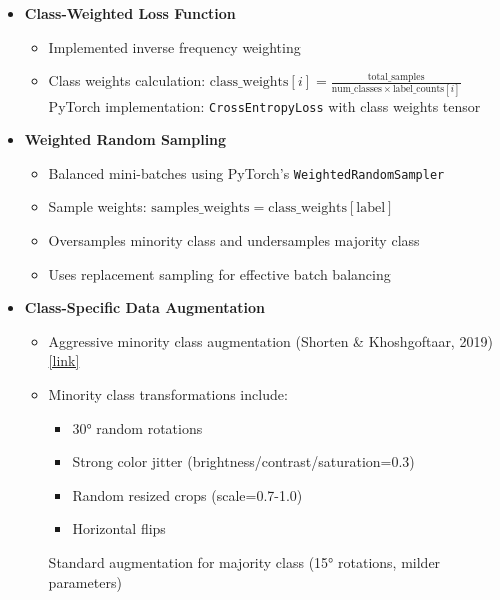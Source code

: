 \documentclass[a4paper,12pt]{report}
\begin{document}
\begin{itemize}
    \item \textbf{Class-Weighted Loss Function}
    \begin{itemize}
        \item Implemented inverse frequency weighting \citep{cui2019classbalanced}
        \item Class weights calculation: \( \text{class\_weights}[i] = \frac{\text{total\_samples}}{\text{num\_classes} \times \text{label\_counts}[i]} \)
        \subitem PyTorch implementation: \texttt{CrossEntropyLoss} with class weights tensor
    \end{itemize}
    
    \item \textbf{Weighted Random Sampling}
    \begin{itemize}
        \item Balanced mini-batches using PyTorch's \texttt{WeightedRandomSampler}
        \item Sample weights: \( \text{samples\_weights} = \text{class\_weights}[\text{label}] \)
        \item Oversamples minority class and undersamples majority class \citep{buda2018systematic}
        \item Uses replacement sampling for effective batch balancing
    \end{itemize}
    
    \item \textbf{Class-Specific Data Augmentation}
    \begin{itemize}
        \item Aggressive minority class augmentation (Shorten \& Khoshgoftaar, 2019) \href{https://journalofbigdata.springeropen.com/articles/10.1186/s40537-019-0197-0}{[link]}
        \item Minority class transformations include:
        \begin{itemize}
            \item 30° random rotations
            \item Strong color jitter (brightness/contrast/saturation=0.3)
            \item Random resized crops (scale=0.7-1.0)
            \item Horizontal flips
        \end{itemize}
        \subitem Standard augmentation for majority class (15° rotations, milder parameters)
    \end{itemize}
\end{itemize}
\end{document}
